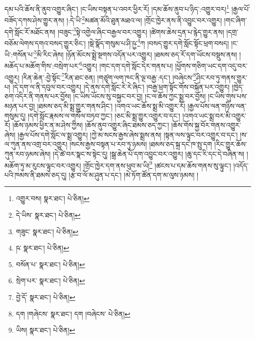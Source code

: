 དམ་པའི་ཆོས་ནི་ནུབ་འགྱུར་ཞིང་། །ང་ཡིས་བསྟན་པ་འབར་ཕྱིར་རོ། །དམ་ཆོས་ནུབ་པ་ཉིད་:འགྱུར་བར།\footnote{འགྱུར་བས།  སྣར་ཐང་།  པེ་ཅིན། } །རྒྱལ་པོ་བཟོད་དཀས་ཤེས་གྱུར་ནས། །:དེ་ཡི་\footnote{དེ་ཡིས་  སྣར་ཐང་།  པེ་ཅིན། }མཚན་མོའི་ཐུན་མཐའ་ལ། །གྲོང་ཁྱེར་ནས་ནི་འབྱུང་བར་འགྱུར། །གང་ཞིག་དགེ་སློང་རོ་མཐོང་ནས། །བཟུང་\footnote{གཟུང་  སྣར་ཐང་།  པེ་ཅིན། }སྟེ་འགྱེལ་ཞིང་བརྒྱལ་བར་འགྱུར། །ཚེགས་ཆེས་དྲན་པ་རྙེད་གྱུར་ནས། །དགྲ་བཅོམ་ལེགས་དགའ་བསད་གྱུར་ཅིང་། །སྡེ་སྣོད་གསུམ་པ་ཤི་ཥྱ་\footnote{ཥ་  སྣར་ཐང་།  པེ་ཅིན། }ཀ །བསད་གྱུར་དགེ་སློང་སྟོང་ཕྲག་བསད། །ང་ཡི་:གསོན་པ་\footnote{བསོན་པ་  སྣར་ཐང་།  པེ་ཅིན། }མི་རིང་ཞེས། །ཉོན་མོངས་སྨྲེ་སྔགས་འདོན་པར་འགྱུར། །ཐམས་ཅད་རོ་དག་ཡོངས་བསྡུས་ནས། །མཆོད་པ་མཆོག་གིས་:བསྲེག་པར་\footnote{སྲེག་པར་  སྣར་ཐང་།  པེ་ཅིན། }འགྱུར། །གང་དག་དགེ་སློང་དེར་གནས་པ། །ཕྱོགས་གཅིག་ཡང་དག་འདུ་བར་འགྱུར། །རིན་ཆེན་:བྱེ་སྟོང་\footnote{བྱེ་དོ་  སྣར་ཐང་།  པེ་ཅིན། }རིན་ཐང་ཅན། །གཙུག་ལག་ཁང་ནི་ལྔ་བརྒྱ་:དང་། །བཞེངས་\footnote{དག །གཞེངས་  སྣར་ཐང་། དག །བཞེངས་  པེ་ཅིན། }ཤིང་རབ་ཏུ་གནས་གྱུར་པ། །དེ་དག་ལ་ནི་དབུལ་བར་འགྱུར། །དེ་ནས་དགེ་སློང་རེ་རེ་ཞིང་། །བརྒྱ་ཕྲག་སྟོང་གོས་བསྐོན་པར་འགྱུར། །ཁྱེད་ཅག་འདིར་ནི་གནས་པར་བྱོས། །ང་ཡིས་ཡོངས་སུ་བསྐྱང་བར་བྱ། །ང་ལ་ཆོས་ཀྱང་སྨྲ་བར་བྱོས། །ང་ཡིས་གུས་པས་མཉན་པར་བྱ། །ཐམས་ཅད་མི་སྨྲ་གྱུར་གནས་ཤིང་། །འགའ་ཡང་ཆོས་སྨྲ་མི་འགྱུར་རོ། །རྒྱལ་པོས་ལན་གཉིས་ལན་གསུམ་དུ། །དགེ་སློང་རྣམས་ལ་གསོལ་བཏབ་ཀྱང་། །ཅང་མི་སྨྲ་གྱུར་འགྱུར་བ་དང་། །འགའ་ཡང་སྨྲ་བར་མི་འགྱུར་རོ། །ཆོས་ཉམས་ཕྱིར་ན་མ་ཤེས་ཀྱིས། །ཆོས་ནུབ་འགྱུར་ཞིང་ཐམས་ཅད་ཀྱང་། །ཆོས་གོས་སྐྱ་བོར་གནས་འགྱུར་ཞེས། །རྒྱལ་པོས་དགེ་སློང་ལ་སྨྲ་འགྱུར། །ཀྱེ་མ་སངས་རྒྱས་ཞེས་སྨྲས་ནས། །སྟན་ལས་ལྟུང་བར་འགྱུར་བ་དང་། །ས་ལ་ཀུན་ནས་འགྲ་བར་འགྱུར། །སངས་རྒྱས་བསྟན་པ་རབ་ཏུ་ཉམས། །ཐམས་ཅད་སྐྲ་དང་ཁ་སྤུ་དག །རིང་གྱུར་ཆོས་ཀུན་རབ་ཉམས་ཞེས། །དེ་ཚེ་བར་སྣང་ས་སྟེང་དུ། །སྒྲ་ཆེན་པོ་དག་འབྱུང་བར་འགྱུར། །ཆུ་དང་རི་དང་དེ་བཞིན་ས། །མཆོག་ཏུ་མ་རུངས་ལྟུང་བར་འགྱུར། །གྲོང་ཁྱེར་དག་ནས་ཕུབ་མ་ཡི།\footnote{ཡིས།  སྣར་ཐང་།  པེ་ཅིན། } །ཚངས་པ་དམ་ཆོས་གནས་སུ་ལྟུང་། །འདོད་པའི་ཁམས་ནི་ཐམས་ཅད་དུ། །རྩ་བ་ལོ་མ་ཤུན་པ་དང་། །མེ་ཏོག་ཚོན་དག་མ་ལུས་ཉམས། །
